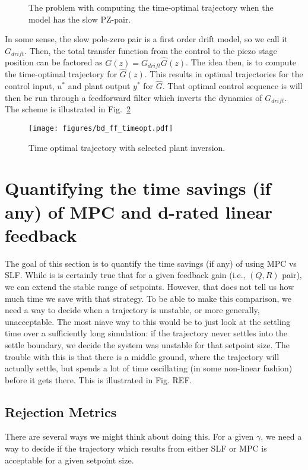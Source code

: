 \documentclass[journal,12pt,twocolumn,twoside]{IEEEtran/IEEEtran}
\begin{document}
\begin{figure}
  \centering
  
  
  \caption{The problem with computing the time-optimal trajectory when the model has the slow PZ-pair.}
  \label{fig:slowpz_to}
\end{figure}
In some sense, the slow pole-zero pair is a first order drift model, so we call it $G_{drift}$. Then, the total transfer function from the control to the piezo stage position can be factored as $G(z) = G_{drift}\hat{G}(z)$. The idea then, is to compute the time-optimal trajectory for $\hat{G}(z)$. This results in optimal trajectories for the control input, $u^*$ and plant output $y^*$ for $\hat{G}$. That optimal control sequence is will then be run through a feedforward filter which inverts the dynamics of $G_{drift}$. The scheme is illustrated in Fig.~\ref{fig:bd_ff_to}
\begin{figure}
  \centering
  \texttt{[image: figures/bd\_ff\_timeopt.pdf]}
  \caption{Time optimal trajectory with selected plant inversion.}
  \label{fig:bd_ff_to}
\end{figure}


\section{Quantifying the time savings (if any) of MPC and d-rated linear feedback}
\label{sec:org7edf36d}
The goal of this section is to quantify the time savings (if any) of using MPC vs SLF. While is is certainly true that for a given feedback gain (i.e., $(Q,R)$ pair), we can extend the stable range of setpoints. However, that does not tell us how much time we save with that strategy. To be able to make this comparison, we need a way to decide when a trajectory is unstable, or more generally, unacceptable. The most niave way to this would be to just look at the settling time over a sufficiently long simulation: if the trajectory never settles into the settle boundary, we decide the system was unstable for that setpoint size. The trouble with this is that there is a middle ground, where the trajectory will actually settle, but spends a lot of time oscillating (in some non-linear fashion) before it gets there. This is illustrated in Fig. REF.


\subsection{Rejection Metrics}
There are several ways we might think about doing this. 
For a given $\gamma$, we need a way to decide if the trajectory which results from either SLF or MPC is acceptable for a given setpoint size.
\end{document}
